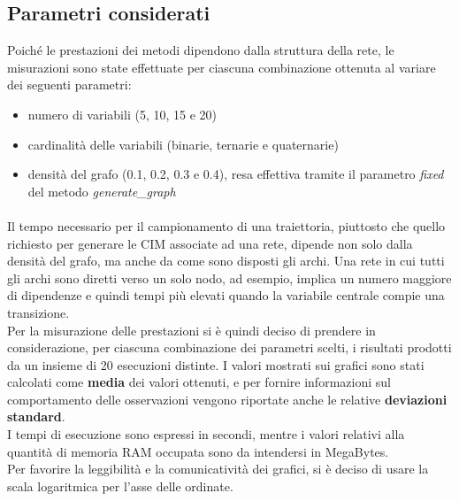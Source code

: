   \subsection{Parametri considerati}
  Poiché le prestazioni dei metodi dipendono dalla struttura della rete, le misurazioni sono state
  effettuate per ciascuna combinazione ottenuta al variare dei seguenti parametri:
  \begin{itemize}
    \item numero di variabili (5, 10, 15 e 20)
    \item cardinalità delle variabili (binarie, ternarie e quaternarie)
    \item densità del grafo (0.1, 0.2, 0.3 e 0.4), resa effettiva tramite il parametro \textit{fixed}
      del metodo \textit{generate\_graph}
  \end{itemize}
  
  \paragraph{}
  Il tempo necessario per il campionamento di una traiettoria, piuttosto che quello
  richiesto per generare le CIM associate ad una rete, dipende non solo dalla densità
  del grafo, ma anche da come sono disposti gli archi. Una rete in cui tutti gli archi sono
  diretti verso un solo nodo, ad esempio, implica un numero maggiore di dipendenze e quindi tempi
  più elevati quando la variabile centrale compie una transizione.\\
  Per la misurazione delle prestazioni si è quindi deciso di prendere in considerazione, per
  ciascuna combinazione dei parametri scelti, i risultati prodotti da un insieme di 20 esecuzioni distinte.
  I valori mostrati sui grafici sono stati calcolati come \textbf{media} dei valori ottenuti, e per fornire informazioni
  sul comportamento delle osservazioni vengono riportate anche le relative \textbf{deviazioni standard}.\\
  I tempi di esecuzione sono espressi in secondi, mentre i valori relativi alla quantità di memoria
  RAM occupata sono da intendersi in MegaBytes.\\
  Per favorire la leggibilità e la comunicatività dei grafici, si è deciso di usare la scala logaritmica per l'asse
  delle ordinate.

